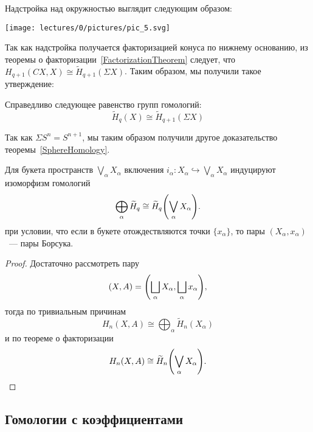     \begin{example}
        Надстройка над окружностью выглядит следующим образом:
        \begin{center}
            \texttt{[image: lectures/0/pictures/pic\_5.svg]}
        \end{center}
    \end{example}

    Так как надстройка получается факторизацией конуса по нижнему основанию, из теоремы о факторизации~\ref{FactorizationTheorem} следует, что $H_{q + 1}(CX, X) \cong \widetilde{H}_{q + 1}(\Sigma X)$.
    Таким образом, мы получили такое утверждение:
    \begin{theorem}
        Справедливо следующее равенство групп гомологий:
        \[ \widetilde{H}_{q}(X) \cong \widetilde{H}_{q + 1}(\Sigma X) \]
    \end{theorem}

    \begin{remark}
       Так как $\Sigma S^n = S^{n + 1}$, мы таким образом получили другое доказательство теоремы~\ref{SphereHomology}.
    \end{remark}

    \begin{theorem}\label{BouqetHomology}
        Для букета пространств $\bigvee_{\alpha} X_{\alpha}$ включения $i_{\alpha}\colon X_{\alpha} \hookrightarrow \bigvee_{\alpha} X_{\alpha}$
        индуцируют изоморфизм гомологий
        \[ \bigoplus_{\alpha} \widetilde{H}_{q} \cong \widetilde{H}_{q}\lr*{\bigvee_{\alpha} X_{\alpha}}. \]
        при условии, что если в букете отождествляются точки $\{ x_{\alpha} \}$, то пары $(X_{\alpha}, x_{\alpha})$~--- пары Борсука.
    \end{theorem}
    \begin{proof}
        Достаточно рассмотреть пару
        \[ (X, A) = \lr*{\bigsqcup_{\alpha} X_{\alpha}, \bigsqcup_{\alpha} x_{\alpha}}, \]
        тогда по тривиальным причинам
        \[ H_{n}(X, A) \cong \bigoplus_{\alpha} \widetilde{H}_{n}(X_{\alpha}) \]
        и по теореме о факторизации
        \[ H_{n}(X, A) \cong \widetilde{H}_{n}\lr*{\bigvee_{\alpha}X_{\alpha}}. \]
    \end{proof}

    \subsection{Гомологии с коэффициентами}

